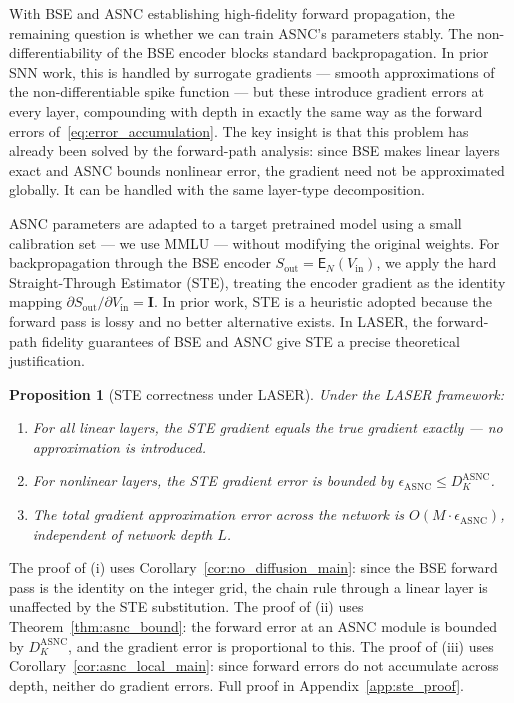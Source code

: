 \documentclass{article}
\theoremstyle{plain}
\newtheorem{proposition}[theorem]{Proposition}
\theoremstyle{definition}
\theoremstyle{remark}
\begin{document}
With BSE and ASNC establishing high-fidelity forward propagation, the remaining
question is whether we can train ASNC's parameters stably. The non-differentiability
of the BSE encoder blocks standard backpropagation. In prior SNN work, this is
handled by surrogate gradients — smooth approximations of the non-differentiable spike
function — but these introduce gradient errors at every layer, compounding with depth
in exactly the same way as the forward errors of~\eqref{eq:error_accumulation}. The
key insight is that this problem has already been solved by the forward-path analysis:
since BSE makes linear layers exact and ASNC bounds nonlinear error, the gradient
need not be approximated globally. It can be handled with the same layer-type
decomposition.

ASNC parameters are adapted to a target pretrained model using a small calibration
set — we use MMLU — without modifying the original weights. For backpropagation
through the BSE encoder $S_{\mathrm{out}} = \mathsf{E}_N(V_{\mathrm{in}})$, we apply
the hard Straight-Through Estimator (STE), treating the encoder gradient as the
identity mapping $\partial S_{\mathrm{out}} / \partial V_{\mathrm{in}} = \mathbf{I}$.
%
In prior work, STE is a heuristic adopted because the forward pass is lossy and no
better alternative exists. In LASER, the forward-path fidelity guarantees of BSE and
ASNC give STE a precise theoretical justification.
\begin{proposition}[STE correctness under LASER]
\label{prop:ste_main}
Under the LASER framework:
\begin{enumerate}
  \item For all linear layers, the STE gradient equals the true gradient exactly —
        no approximation is introduced.
  \item For nonlinear layers, the STE gradient error is bounded by
        $\epsilon_{\mathrm{ASNC}} \le D_K^{\mathrm{ASNC}}$.
  \item The total gradient approximation error across the network is
        $O(M \cdot \epsilon_{\mathrm{ASNC}})$, independent of network depth $L$.
\end{enumerate}
\end{proposition}

The proof of (i) uses Corollary~\ref{cor:no_diffusion_main}: since the BSE forward
pass is the identity on the integer grid, the chain rule through a linear layer is
unaffected by the STE substitution. The proof of (ii) uses
Theorem~\ref{thm:asnc_bound}: the forward error at an ASNC module is bounded by
$D_K^{\mathrm{ASNC}}$, and the gradient error is proportional to this. The proof of
(iii) uses Corollary~\ref{cor:asnc_local_main}: since forward errors do not
accumulate across depth, neither do gradient errors. Full proof in
Appendix~\ref{app:ste_proof}.
\end{document}
